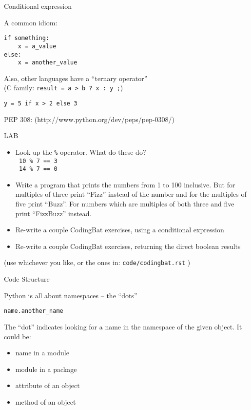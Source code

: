\documentclass{beamer}
\begin{document}
\begin{frame}[fragile]{Conditional expression}

{\large A common idiom:}
\begin{verbatim}
if something:
    x = a_value
else:
    x = another_value
\end{verbatim}
\vfill
{\large Also, other languages have a ``ternary operator''}\\
\hspace{0.2in}(C family: \verb|result = a > b ? x : y ;|)

\vfill
{ \Large \verb|y = 5 if x > 2 else 3| }

\vfill
{\large PEP 308:}
(http://www.python.org/dev/peps/pep-0308/)

\end{frame}



\begin{frame}[fragile]{LAB}

\begin{itemize}
  \item Look up the \verb+%+ operator. What do these do?\\
    \verb| 10 % 7 == 3 | \\
    \verb| 14 % 7 == 0 |
  \item  Write a program that prints the numbers from 1 to 100 inclusive.
But for multiples of three print ``Fizz'' instead of the number and for the
multiples of five print ``Buzz''. For numbers which are multiples of both three
and five print ``FizzBuzz'' instead.

  \item Re-write a couple CodingBat exercises, using a conditional expression


  \item Re-write a couple CodingBat exercises, returning the direct boolean results\\
\end{itemize}

(use whichever you like, or the ones in: \verb|code/codingbat.rst| )

\end{frame}

\begin{frame}[fragile]{Code Structure}

{\Large Python is all about namespaces --  the ``dots'' }

\vfill
\verb|name.another_name|

\vfill
The ``dot'' indicates looking for a name in the namespace of the
given object. It could be:

\begin{itemize}
\item name in a module
\item module in a package
\item attribute of an object
\item method of an object
\end{itemize}

\end{frame}
\end{document}
